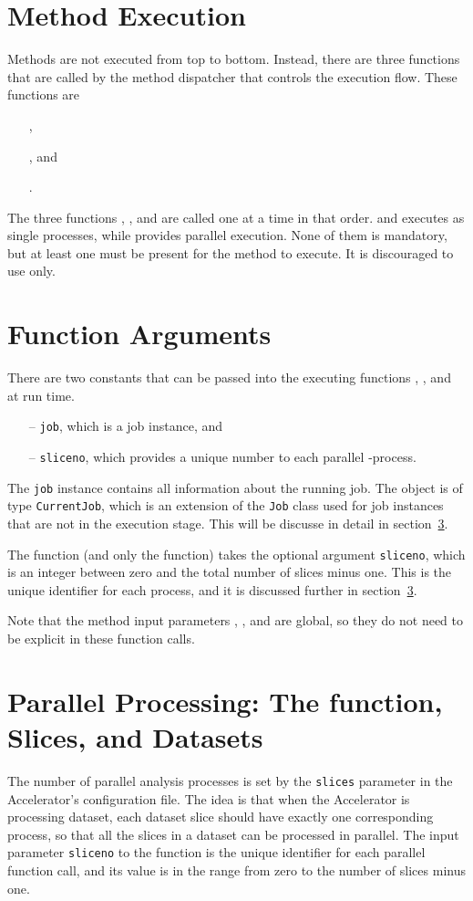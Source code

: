 \section{Method Execution}
Methods are not executed from top to bottom.  Instead, there are three
functions that are called by the method dispatcher that controls the
execution flow.  These functions are
\begin{itemize}
\item [] \prepare,
\item [] \analysis, and
\item [] \synthesis.
\end{itemize}
The three functions \prepare, \analysis, and \synthesis are called one
at a time in that order.  \prepare and \synthesis executes as single
processes, while \analysis provides parallel execution.  None of them
is mandatory, but at least one must be present for the method to
execute.  It is discouraged to use \prepare only.



\section{Function Arguments}
There are two constants that can be passed into the executing
functions \prepare, \analysis, and \synthesis at run time.
\begin{itemize}
\item[--] \texttt{job}, which is a job instance, and
\item[--] \texttt{sliceno}, which provides a unique number to each
  parallel \analysis-process.
\end{itemize}

The \texttt{job} instance contains all information about the running
job.  The object is of type \texttt{CurrentJob}, which is an extension
of the \texttt{Job} class used for job instances that are not in the
execution stage.  This will be discusse in detail in section~\ref{}.

The \analysis function (and only the \analysis function) takes the
optional argument \texttt{sliceno}, which is an integer between zero
and the total number of slices minus one.  This is the unique
identifier for each \analysis process, and it is discussed further in
section~\ref{}.

Note that the method input parameters \options, \jobids, and \datasets
are global, so they do not need to be explicit in these function
calls.


\section{Parallel Processing:  The \analysis function, Slices, and Datasets}
The number of parallel analysis processes is set by the
\texttt{slices} parameter in the Accelerator's configuration file.
The idea is that when the Accelerator is processing dataset, each
dataset slice should have exactly one corresponding \analysis process,
so that all the slices in a dataset can be processed in parallel.  The
input parameter \texttt{sliceno} to the \analysis function is the
unique identifier for each parallel function call, and its value is in
the range from zero to the number of slices minus one.



